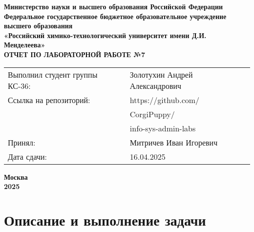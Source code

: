 \documentclass[12pt, a4paper]{report}
\begin{document}
	\begin{titlepage}
		\begin{center}
			\large \textbf{Министерство науки и высшего образования Российской Федерации} \\
			\large \textbf{Федеральное государственное бюджетное образовательное учреждение высшего образования} \\
			\large \textbf{«Российский химико-технологический университет имени Д.И. Менделеева»} \\

			\vspace*{4cm}
			\LARGE \textbf{ОТЧЕТ ПО ЛАБОРАТОРНОЙ РАБОТЕ №7}

			\vspace*{4cm}
			\begin{flushright}
				\Large
				\begin{tabular}{>{\raggedleft\arraybackslash}p{8.85cm} p{10.8cm}}
					Выполнил студент группы КС-36: & Золотухин Андрей Александрович \\
					Ссылка на репозиторий: & https://github.com/ \\ 
					& CorgiPuppy/ \\
					& info-sys-admin-labs \\
					Принял: & Митричев Иван Игоревич \\
					Дата сдачи: & 16.04.2025 \\
				\end{tabular}

			\end{flushright}

			\vspace*{6cm}
			\Large \textbf{Москва \\ 2025}
		\end{center}
	\end{titlepage}
	
	\tableofcontents	
	\thispagestyle{empty}
	\newpage

	
	\section*{Описание и выполнение задачи}
	\large
\end{document}
